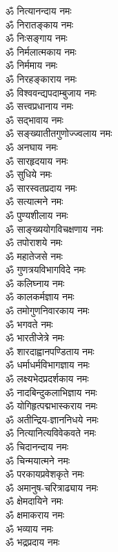 \begin{multicols}{2}
\begin{flushleft}
        ॐ नित्यानन्दाय नमः\\
        ॐ निरातङ्काय नमः\\
        ॐ निःसङ्गाय नमः\\
        ॐ निर्मलात्मकाय नमः\\
        ॐ निर्ममाय नमः\\
        ॐ निरहङ्काराय नमः\\
        ॐ विश्ववन्द्यपदाम्बुजाय नमः\\
        ॐ सत्त्वप्रधानाय नमः\\
        ॐ सद्भावाय नमः\\
        ॐ सङ्ख्यातीतगुणोज्ज्वलाय नमः\hfill{}\\
                                        
        ॐ अनघाय नमः\\
        ॐ सारहृदयाय नमः\\
        ॐ सुधिये नमः\\
        ॐ सारस्वतप्रदाय नमः\\
        ॐ सत्यात्मने नमः\\
        ॐ पुण्यशीलाय नमः\\
        ॐ साङ्ख्ययोगविचक्षणाय नमः\\
        ॐ तपोराशये नमः\\
        ॐ महातेजसे नमः\\
        ॐ गुणत्रयविभागविदे नमः\hfill{}\\
                                        
        ॐ कलिघ्नाय नमः\\
        ॐ कालकर्मज्ञाय नमः\\
        ॐ तमोगुणनिवारकाय नमः\\
        ॐ भगवते नमः\\
        ॐ भारतीजेत्रे नमः\\
        ॐ शारदाह्वानपण्डिताय नमः\\
        ॐ धर्माधर्मविभागज्ञाय नमः\\
        ॐ लक्ष्यभेदप्रदर्शकाय नमः\\
        ॐ नादबिन्दुकलाभिज्ञाय नमः\\
        ॐ योगिहृत्पद्मभास्कराय नमः\hfill{}\\
                                        
        ॐ अतीन्द्रिय-ज्ञाननिधये नमः\\
        ॐ नित्यानित्यविवेकवते नमः\\
        ॐ चिदानन्दाय नमः\\
        ॐ चिन्मयात्मने नमः\\
        ॐ परकायप्रवेशकृते नमः\\
        ॐ अमानुष-चरित्राढ्याय नमः\\
        ॐ क्षेमदायिने नमः\\
        ॐ क्षमाकराय नमः\\
        ॐ भव्याय नमः\\
        ॐ भद्रप्रदाय नमः\hfill{}\\
                                        

\end{flushleft}
\end{multicols}
